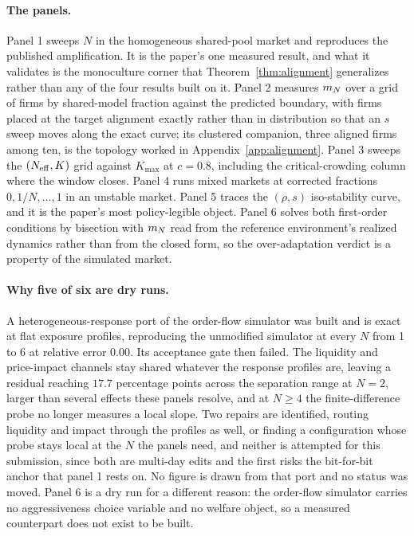 \paragraph{The panels.} Panel 1 sweeps $N$ in the homogeneous shared-pool market and reproduces the published amplification. It is the paper's one measured result, and what it validates is the monoculture corner that Theorem~\ref{thm:alignment} generalizes rather than any of the four results built on it. Panel 2 measures $m_N$ over a grid of firms by shared-model fraction against the predicted boundary, with firms placed at the target alignment exactly rather than in distribution so that an $s$ sweep moves along the exact curve; its clustered companion, three aligned firms among ten, is the topology worked in Appendix~\ref{app:alignment}. Panel 3 sweeps the $(N_{\mathrm{eff}}, K)$ grid against $K_{\max}$ at $c = 0.8$, including the critical-crowding column where the window closes. Panel 4 runs mixed markets at corrected fractions $0, 1/N, \ldots, 1$ in an unstable market. Panel 5 traces the $(\rho, s)$ iso-stability curve, and it is the paper's most policy-legible object. Panel 6 solves both first-order conditions by bisection with $m_N$ read from the reference environment's realized dynamics rather than from the closed form, so the over-adaptation verdict is a property of the simulated market.

\paragraph{Why five of six are dry runs.} A heterogeneous-response port of the order-flow simulator was built and is exact at flat exposure profiles, reproducing the unmodified simulator at every $N$ from 1 to 6 at relative error $0.00$. Its acceptance gate then failed. The liquidity and price-impact channels stay shared whatever the response profiles are, leaving a residual reaching $17.7$ percentage points across the separation range at $N=2$, larger than several effects these panels resolve, and at $N \geq 4$ the finite-difference probe no longer measures a local slope. Two repairs are identified, routing liquidity and impact through the profiles as well, or finding a configuration whose probe stays local at the $N$ the panels need, and neither is attempted for this submission, since both are multi-day edits and the first risks the bit-for-bit anchor that panel 1 rests on. No figure is drawn from that port and no status was moved. Panel 6 is a dry run for a different reason: the order-flow simulator carries no aggressiveness choice variable and no welfare object, so a measured counterpart does not exist to be built.

